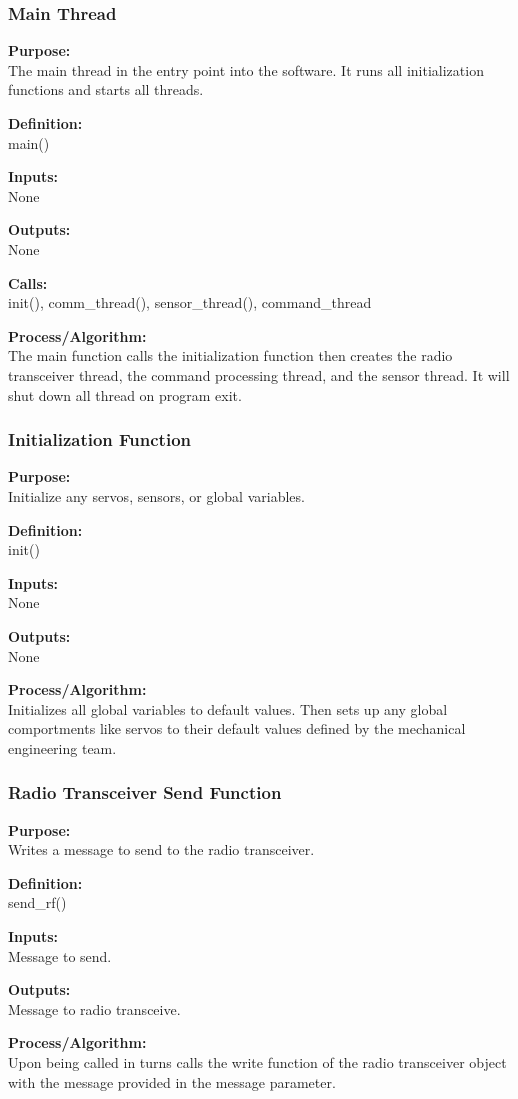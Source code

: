 \documentclass[10pt,draftclsnofoot,onecolumn,compsoc]{IEEEtran}
\begin{document}
\subsubsection{Main Thread}
{\bf Purpose:} \\
The main thread in the entry point into the software. It runs all initialization functions and starts all threads. \par
{\bf Definition:} \\ 
main() \par
{\bf Inputs:} \\  None \par
{\bf Outputs:} \\ None \par
{\bf Calls:} \\ init(), comm\_thread(), sensor\_thread(), command\_thread \par
{\bf Process/Algorithm:} \\
The main function calls the initialization function then creates the radio transceiver thread, the command processing thread, and the sensor thread. It will shut down all thread on program exit. \par
\subsubsection{Initialization Function}
{\bf Purpose:} \\
Initialize any servos, sensors, or global variables. \par
{\bf Definition:} \\ 
init() \par
{\bf Inputs:} \\  None \par
{\bf Outputs:} \\ None \par
{\bf Process/Algorithm:} \\
Initializes all global variables to default values. Then sets up any global comportments like servos to their default values defined by the mechanical engineering team. \par
\subsubsection{Radio Transceiver Send Function}
{\bf Purpose:} \\
Writes a message to send to the radio transceiver. \par
{\bf Definition:} \\ 
send\_rf() \par
{\bf Inputs:} \\  Message to send. \par
{\bf Outputs:} \\ Message to radio transceive. \par
{\bf Process/Algorithm:} \\
Upon being called in turns calls the write function of the radio transceiver object with the message provided in the message parameter. 
\end{document}
